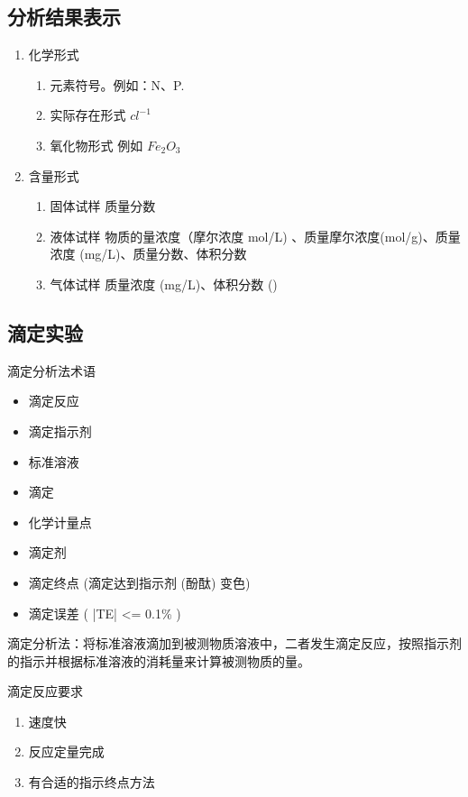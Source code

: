\subsection{分析结果表示}
\begin{enumerate}
	\item 化学形式
	\begin{enumerate}
		\item 元素符号。例如：N、P.
		\item 实际存在形式 $cl^{-1}$
		\item 氧化物形式 例如 $Fe_2O_3$ 
		
	\end{enumerate}

	\item 含量形式
	\begin{enumerate}
		\item 固体试样 质量分数
		\item 液体试样 物质的量浓度（摩尔浓度 mol/L) 、质量摩尔浓度(mol/g)、质量浓度 (mg/L)、质量分数、体积分数
		\item 气体试样 质量浓度 (mg/L)、体积分数 ()
		
	\end{enumerate}
	
\end{enumerate}

\subsection{滴定实验}

滴定分析法术语
\begin{itemize}
	\item 滴定反应
	\item 滴定指示剂
	\item 标准溶液
	\item 滴定
	\item 化学计量点 
	\item 滴定剂
	\item 滴定终点 (滴定达到指示剂 (酚酞) 变色)
	\item 滴定误差 ( |TE| <= 0.1\% )
	
\end{itemize}

滴定分析法：将标准溶液滴加到被测物质溶液中，二者发生滴定反应，按照指示剂的指示并根据标准溶液的消耗量来计算被测物质的量。

滴定反应要求
\begin{enumerate}
	\item 速度快
	\item 反应定量完成
	\item 有合适的指示终点方法
	
\end{enumerate}

